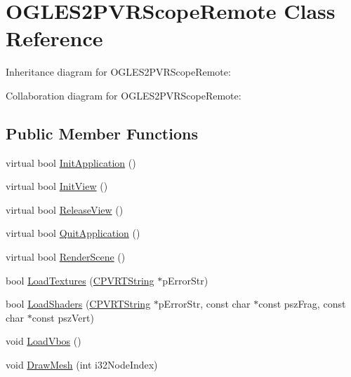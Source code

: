 \hypertarget{class_o_g_l_e_s2_p_v_r_scope_remote}{\section{O\+G\+L\+E\+S2\+P\+V\+R\+Scope\+Remote Class Reference}
\label{class_o_g_l_e_s2_p_v_r_scope_remote}
}


Inheritance diagram for O\+G\+L\+E\+S2\+P\+V\+R\+Scope\+Remote\+:


Collaboration diagram for O\+G\+L\+E\+S2\+P\+V\+R\+Scope\+Remote\+:
\subsection*{Public Member Functions}
\begin{DoxyCompactItemize}
\item 
virtual bool \hyperlink{class_o_g_l_e_s2_p_v_r_scope_remote_af0bfafb7123df24f92c39ab126be8c64}{Init\+Application} ()
\item 
virtual bool \hyperlink{class_o_g_l_e_s2_p_v_r_scope_remote_a34819d6a18ee75f5627c10408ce040bd}{Init\+View} ()
\item 
virtual bool \hyperlink{class_o_g_l_e_s2_p_v_r_scope_remote_a01491b45d66d76586a85d3da4fd2bfad}{Release\+View} ()
\item 
virtual bool \hyperlink{class_o_g_l_e_s2_p_v_r_scope_remote_acc20778b733d71af5dfd3dd17da916a8}{Quit\+Application} ()
\item 
virtual bool \hyperlink{class_o_g_l_e_s2_p_v_r_scope_remote_a32713a1496b40adada64f04deec5d006}{Render\+Scene} ()
\item 
bool \hyperlink{class_o_g_l_e_s2_p_v_r_scope_remote_aacf32e3c5b51f560e47a9d9cdc7ca735}{Load\+Textures} (\hyperlink{class_c_p_v_r_t_string}{C\+P\+V\+R\+T\+String} $\ast$p\+Error\+Str)
\item 
bool \hyperlink{class_o_g_l_e_s2_p_v_r_scope_remote_a4c1e2e0559f92218075a623c3527dc15}{Load\+Shaders} (\hyperlink{class_c_p_v_r_t_string}{C\+P\+V\+R\+T\+String} $\ast$p\+Error\+Str, const char $\ast$const psz\+Frag, const char $\ast$const psz\+Vert)
\item 
void \hyperlink{class_o_g_l_e_s2_p_v_r_scope_remote_ac2c21b41b3193c46979877e20429f9f3}{Load\+Vbos} ()
\item 
void \hyperlink{class_o_g_l_e_s2_p_v_r_scope_remote_a2cffeefb72406ac94dcf15d45f7d080b}{Draw\+Mesh} (int i32\+Node\+Index)
\end{DoxyCompactItemize}


